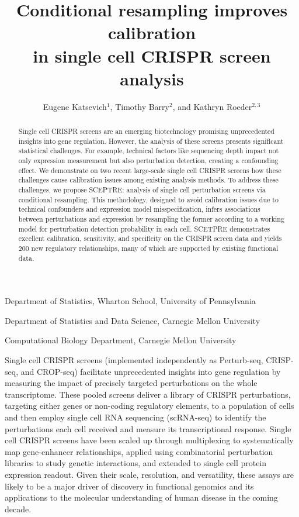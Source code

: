 \documentclass{nature}
\title{Conditional resampling improves calibration \\ in single cell CRISPR screen analysis}
\author{Eugene Katsevich$^{1}$, Timothy Barry$^{2}$, and Kathryn Roeder$^{2,3}$}
\begin{document}
\maketitle

\addtocounter{page}{-1}
\thispagestyle{empty}

\begin{affiliations}
 \item Department of Statistics, Wharton School, University of Pennsylvania
 \item Department of Statistics and Data Science, Carnegie Mellon University
 \item Computational Biology Department, Carnegie Mellon University
\end{affiliations}


\begin{abstract}
Single cell CRISPR screens are an emerging biotechnology promising unprecedented insights into gene regulation. However, the analysis of these screens presents significant statistical challenges. For example, technical factors like sequencing depth impact not only expression measurement but also perturbation detection, creating a confounding effect. We demonstrate on two recent large-scale single cell CRISPR screens how these challenges cause calibration issues among existing analysis methods. To address these challenges, we propose SCEPTRE: analysis of single cell perturbation screens via conditional resampling. This methodology, designed to avoid calibration issues due to technical confounders and expression model misspecification, infers associations between perturbations and expression by resampling the former according to a working model for perturbation detection probability in each cell. SCETPRE demonstrates excellent calibration, sensitivity, and specificity on the CRISPR screen data and yields 200 new regulatory relationships, many of which are supported by existing functional data.
\end{abstract}

\clearpage

Single cell CRISPR screens (implemented independently as Perturb-seq\cite{Dixit2016, Adamson2016}, CRISP-seq\cite{Jaitin2016}, and CROP-seq\cite{Datlinger2017}) facilitate unprecedented insights into gene regulation by measuring the impact of precisely targeted perturbations on the whole transcriptome. These pooled screens deliver a library of CRISPR perturbations, targeting either genes or non-coding regulatory elements, to a population of cells and then employ single cell RNA sequencing (scRNA-seq) to identify the perturbations each cell received and measure its transcriptional response. Single cell CRISPR screens have been scaled up through multiplexing to systematically map gene-enhancer relationships,\cite{Xie2017,Gasperini2019,Xie2019} applied using combinatorial perturbation libraries to study genetic interactions,\cite{Norman2019} and extended to single cell protein expression readout.\cite{Mimitou2019,Frangieh2020} Given their scale, resolution, and versatility, these assays are likely to be a major driver of discovery in functional genomics and its applications to the molecular understanding of human disease in the coming decade.\cite{Gasperini2020} 
\end{document}

